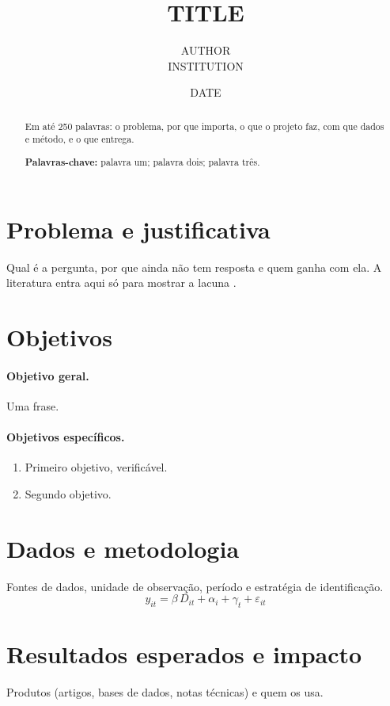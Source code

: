 \documentclass[12pt,a4paper]{article}
\title{{{TITLE}}}
\author{{{AUTHOR}}\\{{INSTITUTION}}}
\date{{{DATE}}}
\begin{document}
\maketitle

\begin{abstract}
\noindent Em até 250 palavras: o problema, por que importa, o que o projeto faz, com que dados e método, e o que entrega.

\medskip
\noindent\textbf{Palavras-chave:} palavra um; palavra dois; palavra três.
\end{abstract}

\section{Problema e justificativa}
Qual é a pergunta, por que ainda não tem resposta e quem ganha com ela. A literatura entra aqui só para mostrar a lacuna \citep{card1994minimum}.

\section{Objetivos}
\paragraph{Objetivo geral.} Uma frase.
\paragraph{Objetivos específicos.}
\begin{enumerate}[nosep]
  \item Primeiro objetivo, verificável.
  \item Segundo objetivo.
\end{enumerate}

\section{Dados e metodologia}
Fontes de dados, unidade de observação, período e estratégia de identificação.
\begin{equation}
  y_{it} = \beta\, D_{it} + \alpha_i + \gamma_t + \varepsilon_{it}
\end{equation}

\section{Resultados esperados e impacto}
Produtos (artigos, bases de dados, notas técnicas) e quem os usa.
\end{document}
